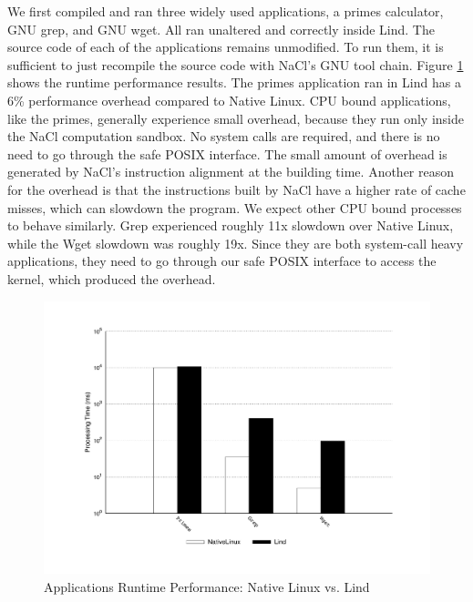We first compiled and ran three widely used applications, 
a primes calculator, GNU grep, and GNU wget. All ran unaltered and
correctly inside Lind. The source code of each of the applications remains 
unmodified. To run them, it is sufficient to just recompile the source code with 
NaCl's GNU tool chain.
Figure \ref{fig:performance_applications} shows the runtime performance
results. 
The primes application ran in Lind has a 6\% performance overhead compared to 
Native Linux. CPU bound applications, like the primes, generally experience small overhead, 
because they run only inside the NaCl computation sandbox. No system calls are required, 
and there is no need to go through the safe POSIX interface. The small amount of overhead 
is generated by NaCl's instruction alignment at the building time. Another reason for the overhead 
is that the instructions built by NaCl have a higher rate of cache misses, which can slowdown the 
program. 
We expect other CPU bound processes to behave similarly. 
Grep experienced roughly 11x slowdown over Native Linux, while the Wget
slowdown was roughly 19x. Since they are both system-call heavy applications, they need to go 
through our safe POSIX interface to access the kernel, which produced the overhead.  

\begin{figure}
\centering
\includegraphics[width=1.0\columnwidth]{diagram/lind_oakland16_performance.pdf}
\caption{Applications Runtime Performance: Native Linux vs. Lind}
\label{fig:performance_applications}
\end{figure}


